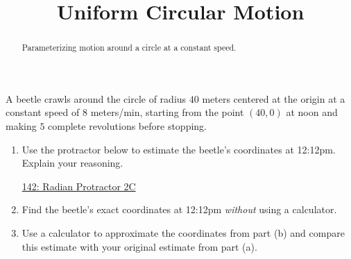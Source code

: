 \documentclass{ximera}
\title{Uniform Circular Motion}
\begin{document}
\begin{abstract}
Parameterizing motion around a circle at a constant speed.
\end{abstract}
\maketitle



\begin{example}  \label{Exp89dfe94tf4}

A beetle crawls around the circle of radius $40$ meters centered at the origin at a constant speed of $8$ meters/min, starting from the point $(40,0)$ at noon and making $5$ complete revolutions before stopping.

\begin{enumerate}

\item Use the protractor below to estimate the beetle's coordinates at 12:12pm. Explain your reasoning.

\begin{onlineOnly}
    \begin{center}
\end{center}
\end{onlineOnly}

\href{https://www.desmos.com/calculator/lbkveixdno}{142: Radian Protractor 2C}

\item Find the beetle's exact coordinates at 12:12pm \emph{without} using a calculator.

\item Use a calculator to approximate the coordinates from part (b) and compare this estimate with your original estimate from part (a).

\end{enumerate}

\end{example}
\end{document}
